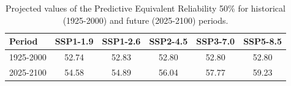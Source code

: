 \begin{table}[htbp]
\centering
\begin{tabular}{lccccc}
\toprule
Period & \textbf{SSP1-1.9} & \textbf{SSP1-2.6} & \textbf{SSP2-4.5} & \textbf{SSP3-7.0} & \textbf{SSP5-8.5} \\
\midrule
1925-2000 & 52.74 & 52.83 & 52.80 & 52.80 & 52.80 \\
2025-2100 & 54.58 & 54.89 & 56.04 & 57.77 & 59.23 \\
\bottomrule
\end{tabular}
\caption{Projected values of the Predictive Equivalent Reliability 50\% for historical (1925-2000) and future (2025-2100) periods.}
\label{tab:pred_scenarios_2per}
\end{table}